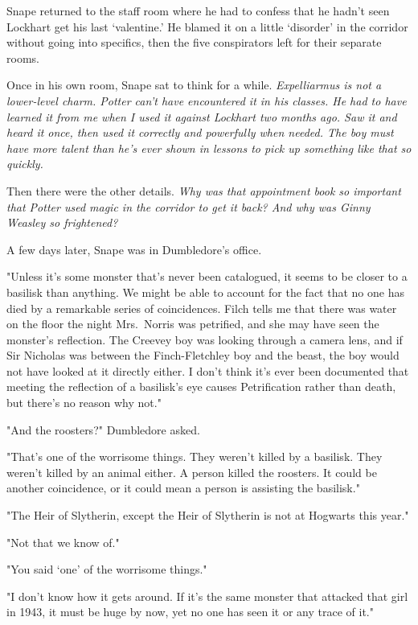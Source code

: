 Snape returned to the staff room where he had to confess that he hadn't seen Lockhart get his last `valentine.' He blamed it on a little `disorder' in the corridor without going into specifics, then the five conspirators left for their separate rooms.

Once in his own room, Snape sat to think for a while. \emph{Expelliarmus is not a lower-level charm. Potter can't have encountered it in his classes. He had to have learned it from me when I used it against Lockhart two months ago. Saw it and heard it once, then used it correctly and powerfully when needed. The boy must have more talent than he's ever shown in lessons to pick up something like that so quickly.}

Then there were the other details. \emph{Why was that appointment book so important that Potter used magic in the corridor to get it back? And why was Ginny Weasley so frightened?}

A few days later, Snape was in Dumbledore's office.

"Unless it's some monster that's never been catalogued, it seems to be closer to a basilisk than anything. We might be able to account for the fact that no one has died by a remarkable series of coincidences. Filch tells me that there was water on the floor the night Mrs.~Norris was petrified, and she may have seen the monster's reflection. The Creevey boy was looking through a camera lens, and if Sir Nicholas was between the Finch-Fletchley boy and the beast, the boy would not have looked at it directly either. I don't think it's ever been documented that meeting the reflection of a basilisk's eye causes Petrification rather than death, but there's no reason why not."

"And the roosters?" Dumbledore asked.

"That's one of the worrisome things. They weren't killed by a basilisk. They weren't killed by an animal either. A person killed the roosters. It could be another coincidence, or it could mean a person is assisting the basilisk."

"The Heir of Slytherin, except the Heir of Slytherin is not at Hogwarts this year."

"Not that we know of."

"You said `one' of the worrisome things."

"I don't know how it gets around. If it's the same monster that attacked that girl in 1943, it must be huge by now, yet no one has seen it or any trace of it."

